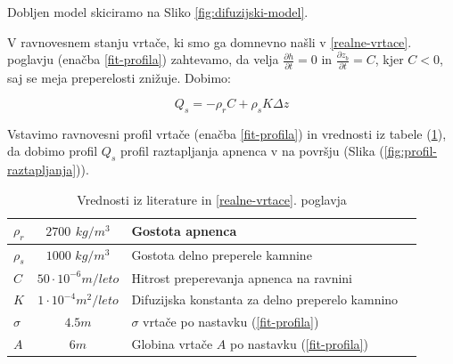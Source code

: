 \documentclass[a4paper, oneside, 12pt]{book}
\begin{document}
Dobljen model skiciramo na Sliko \ref{fig:difuzijski-model}.

V ravnovesnem stanju vrtače, ki smo ga domnevno našli v \ref{realne-vrtace}. poglavju (enačba \ref{fit-profila}) zahtevamo, da velja $\frac{\partial h}{\partial t} = 0$ in $\frac{\partial z_b}{\partial t} = C$, kjer $C<0$, saj se meja preperelosti znižuje. Dobimo:

\begin{equation}
  Q_s = - \rho_r C + \rho_s K \Delta z
  \label{kontinuitetna-enacba-ravnovesje}
\end{equation}

Vstavimo ravnovesni profil vrtače (enačba \ref{fit-profila}) in vrednosti iz tabele (\ref{tab:tabela-konstant}), da dobimo profil $Q_s$ profil raztapljanja apnenca v na površju (Slika (\ref{fig:profil-raztapljanja})).

\begin{table}[h]
  \centering
  \begin{tabular}{| l | c | l | l |} \hline
    $\rho_r$ & $2700$ $kg/m^3$ & Gostota apnenca                                            \\ \hline
    $\rho_s$ & $1000$ $kg/m^3$ & Gostota delno preperele kamnine                            \\ \hline
    $C$      & $50 \cdot 10^{-6} m/leto$  & Hitrost preperevanja apnenca na ravnini         \\ \hline
    $K$      & $1 \cdot 10^{-4} m^2/leto$ & Difuzijska konstanta za delno preperelo kamnino \\ \hline
    $\sigma$ & $4.5m$ & $\sigma$ vrtače po nastavku (\ref{fit-profila})                     \\ \hline
    $A$      & $6m$ & Globina vrtače $A$ po nastavku (\ref{fit-profila})                    \\ \hline
  \end{tabular}
  \caption{Vrednosti iz literature \cite{Gams1967} \cite{ford2007karst} \cite{fleurant2008modelling} in \ref{realne-vrtace}. poglavja}
  \label{tab:tabela-konstant}
\end{table}
\end{document}
